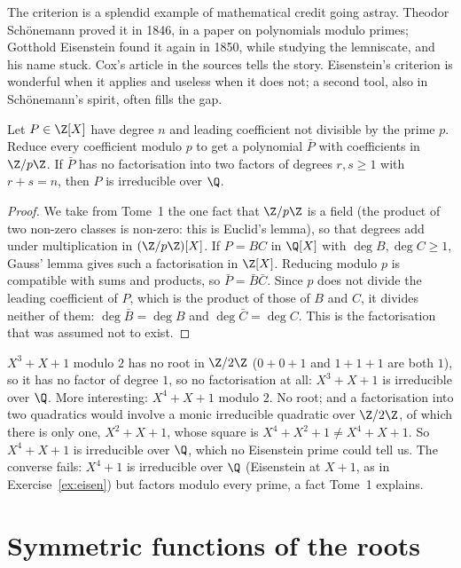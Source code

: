 The criterion is a splendid example of mathematical credit going astray. Theodor Sch\"onemann proved it in 1846, in a paper on polynomials modulo
primes; Gotthold Eisenstein found it again in 1850, while studying the lemniscate, and his name stuck. Cox's article in the sources tells the story.
Eisenstein's criterion is wonderful when it applies and useless when it does not; a second tool, also in Sch\"onemann's spirit, often fills the gap.

\begin{propositionx}
Let $P\in\Z[X]$ have degree $n$ and leading coefficient not divisible by the prime $p$. Reduce every coefficient modulo $p$ to get a polynomial
$\bar P$ with coefficients in $\Z/p\Z$. If $\bar P$ has no factorisation into two factors of degrees $r,s\ge1$ with $r+s=n$, then $P$ is
irreducible over $\Q$.
\end{propositionx}
\begin{proof}
We take from Tome~1 the one fact that $\Z/p\Z$ is a field (the product of two non-zero classes is non-zero: this is Euclid's lemma), so that
degrees add under multiplication in $(\Z/p\Z)[X]$. If $P=BC$ in $\Q[X]$ with $\deg B,\deg C\ge1$, Gauss' lemma gives such a factorisation in $\Z[X]$.
Reducing modulo $p$ is compatible with sums and products, so $\bar P=\bar B\bar C$. Since $p$ does not divide the leading coefficient of $P$, which is
the product of those of $B$ and $C$, it divides neither of them: $\deg\bar B=\deg B$ and $\deg\bar C=\deg C$. This is the factorisation that was
assumed not to exist.
\end{proof}

\begin{examplex}
$X^3+X+1$ modulo $2$ has no root in $\Z/2\Z$ ($0+0+1$ and $1+1+1$ are both $1$), so it has no factor of degree $1$, so no factorisation at all:
$X^3+X+1$ is irreducible over $\Q$. More interesting: $X^4+X+1$ modulo $2$. No root; and a factorisation into two quadratics would involve a monic
irreducible quadratic over $\Z/2\Z$, of which there is only one, $X^2+X+1$, whose square is $X^4+X^2+1\ne X^4+X+1$. So $X^4+X+1$ is irreducible over
$\Q$, which no Eisenstein prime could tell us. The converse fails: $X^4+1$ is irreducible over $\Q$ (Eisenstein at $X+1$, as in
Exercise~\ref{ex:eisen}) but factors modulo every prime, a fact Tome~1 explains.
\end{examplex}

\section{Symmetric functions of the roots}\label{sec:symmetric}

